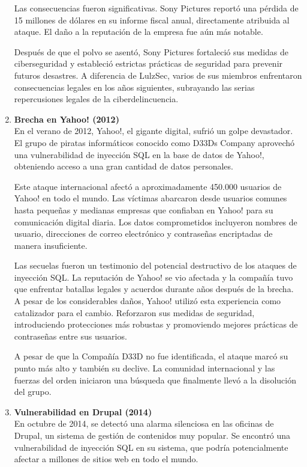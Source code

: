 \documentclass[11pt]{report}
\begin{document}
\begin{enumerate}
  Las consecuencias fueron significativas. Sony Pictures reportó una pérdida de 15 millones de dólares en su informe fiscal anual, directamente atribuida 
  al ataque. El daño a la reputación de la empresa fue aún más notable.

  Después de que el polvo se asentó, Sony Pictures fortaleció sus medidas de ciberseguridad y estableció estrictas prácticas de seguridad para prevenir 
  futuros desastres. A diferencia de LulzSec, varios de sus miembros enfrentaron consecuencias legales en los años siguientes, subrayando las serias 
  repercusiones legales de la ciberdelincuencia.

  \item \textbf{Brecha en Yahoo! (2012)} \\
  En el verano de 2012, Yahoo!, el gigante digital, sufrió un golpe devastador. El grupo de piratas informáticos conocido como D33Ds Company aprovechó
  una vulnerabilidad de inyección SQL en la base de datos de Yahoo!, obteniendo acceso a una gran cantidad de datos personales.

  Este ataque internacional afectó a aproximadamente 450.000 usuarios de Yahoo! en todo el mundo. Las víctimas abarcaron desde usuarios comunes hasta
  pequeñas y medianas empresas que confiaban en Yahoo! para su comunicación digital diaria. Los datos comprometidos incluyeron nombres de usuario, 
  direcciones de correo electrónico y contraseñas encriptadas de manera insuficiente.

  Las secuelas fueron un testimonio del potencial destructivo de los ataques de inyección SQL. La reputación de Yahoo! se vio afectada y la compañía
  tuvo que enfrentar batallas legales y acuerdos durante años después de la brecha. A pesar de los considerables daños, Yahoo! utilizó esta experiencia
  como catalizador para el cambio. Reforzaron sus medidas de seguridad, introduciendo protecciones más robustas y promoviendo mejores prácticas de contraseñas entre sus usuarios.

  A pesar de que la Compañía D33D no fue identificada, el ataque marcó su punto más alto y también su declive. La comunidad internacional y las fuerzas
  del orden iniciaron una búsqueda que finalmente llevó a la disolución del grupo.

  \item \textbf{Vulnerabilidad en Drupal (2014)} \\
  En octubre de 2014, se detectó una alarma silenciosa en las oficinas de Drupal, un sistema de gestión de contenidos muy popular. Se encontró una
  vulnerabilidad de inyección SQL en su sistema, que podría potencialmente afectar a millones de sitios web en todo el mundo.


\end{enumerate}
\end{document}
